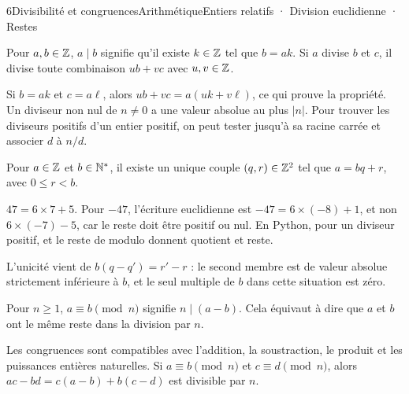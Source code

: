 \begin{ouverture}[denombrement]{6}{Divisibilité et congruences}{Arithmétique}{Entiers relatifs · Division euclidienne · Restes}
\end{ouverture}
\essentiel

\begin{definition}
Pour $a,b\in\mathbb{Z}$, $a\mid b$ signifie qu'il existe $k\in\mathbb{Z}$ tel que $b=ak$.
Si $a$ divise $b$ et $c$, il divise toute combinaison $ub+vc$ avec $u,v\in\mathbb{Z}$.
\end{definition}
Si $b=ak$ et $c=a\ell$, alors $ub+vc=a(uk+v\ell)$, ce qui prouve la propriété.
Un diviseur non nul de $n\ne0$ a une valeur absolue au plus $|n|$. Pour trouver les diviseurs positifs d'un entier positif, on peut tester jusqu'à sa racine carrée et associer $d$ à $n/d$.
\begin{theoreme}
Pour $a\in\mathbb{Z}$ et $b\in\mathbb{N}^*$, il existe un unique couple $(q,r)\in\mathbb{Z}^2$ tel que
$a=bq+r$, avec $0\leq r<b$.
\end{theoreme}
\begin{exemple}
$47=6\times7+5$. Pour $-47$, l'écriture euclidienne est $-47=6\times(-8)+1$, et non $6\times(-7)-5$, car le reste doit être positif ou nul.
En Python, pour un diviseur positif,  et le reste de  modulo  donnent quotient et reste.
\end{exemple}
L'unicité vient de $b(q-q')=r'-r$ : le second membre est de valeur absolue strictement inférieure à $b$, et le seul multiple de $b$ dans cette situation est zéro.
\begin{definition}
Pour $n\geq1$, $a\equiv b\pmod n$ signifie $n\mid(a-b)$. Cela équivaut à dire que $a$ et $b$ ont le même reste dans la division par $n$.
\end{definition}
Les congruences sont compatibles avec l'addition, la soustraction, le produit et les puissances entières naturelles.
Si $a\equiv b\pmod n$ et $c\equiv d\pmod n$, alors $ac-bd=c(a-b)+b(c-d)$ est divisible par $n$.

